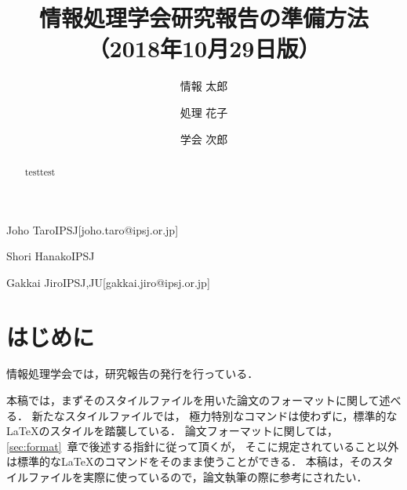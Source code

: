 \documentclass[submit,techrep,noauthor]{ipsj}
\begin{document}
\title{情報処理学会研究報告の準備方法\\
（2018年10月29日版）}





\author{情報 太郎}{Joho Taro}{IPSJ}[joho.taro@ipsj.or.jp]
\author{処理 花子}{Shori Hanako}{IPSJ}
\author{学会 次郎}{Gakkai Jiro}{IPSJ,JU}[gakkai.jiro@ipsj.or.jp]

\begin{abstract}
testtest
\end{abstract}


%
%
%

\maketitle

\section{はじめに}

情報処理学会では，研究報告の発行を行っている．

本稿では，まずそのスタイルファイルを用いた論文のフォーマットに関して述べる．
新たなスタイルファイルでは，
極力特別なコマンドは使わずに，標準的な\LaTeX のスタイルを踏襲している．
論文フォーマットに関しては，\ref{sec:format}~章で後述する指針に従って頂くが，
そこに規定されていること以外は標準的な\LaTeX のコマンドをそのまま使うことができる．
本稿は，そのスタイルファイルを実際に使っているので，論文執筆の際に参考にされたい．
\end{document}
